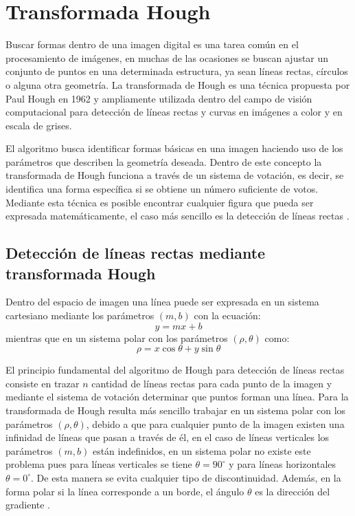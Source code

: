 \section{Transformada Hough} \label{sec:transformada_Hough}

Buscar formas dentro de una imagen digital es una tarea común en el procesamiento de imágenes, en muchas de las ocasiones se buscan ajustar un conjunto de puntos en una determinada estructura, ya sean líneas rectas, círculos o alguna otra geometría. La transformada de Hough es una técnica propuesta por Paul Hough en 1962 y ampliamente utilizada dentro del campo de visión computacional para detección de líneas rectas y curvas en imágenes a color y en escala de grises.

El algoritmo busca identificar formas básicas en una imagen haciendo uso de los parámetros que describen la geometría deseada. Dentro de este concepto la transformada de Hough funciona a través de un sistema de votación, es decir, se identifica una forma específica si se obtiene un número suficiente de votos. Mediante esta técnica es posible encontrar cualquier figura que pueda ser expresada matemáticamente, el caso más sencillo es la detección de líneas rectas \cite{forsyth2011computer}.

\subsection{Detección de líneas rectas mediante transformada Hough} \label{sub:detección_de_líneas_rectas_mediante_transformada_Hough}

Dentro del espacio de imagen una línea puede ser expresada en un sistema cartesiano mediante los parámetros $(m, b)$ con la ecuación:
\begin{equation}
    y = mx + b
\end{equation}
mientras que en un sistema polar con los parámetros $(\rho, \theta)$ como:
\begin{equation}
    \rho = x \cos{\theta} + y \sin{\theta}
    \label{eqn:polar_line} 
\end{equation}

El principio fundamental del algoritmo de Hough para detección de líneas rectas consiste en trazar $n$ cantidad de líneas rectas para cada punto de la imagen y mediante el sistema de votación determinar que puntos forman una línea. Para la transformada de Hough resulta más sencillo trabajar en un sistema polar con los parámetros $(\rho, \theta)$, debido a que para cualquier punto de la imagen existen una infinidad de líneas que pasan a través de él, en el caso de líneas verticales los parámetros $(m, b)$ están indefinidos, en un sistema polar no existe este problema pues para líneas verticales se tiene $\theta = 90^\circ$ y para líneas horizontales $\theta = 0^\circ$. De esta manera se evita cualquier tipo de discontinuidad. Además, en la forma polar si la línea corresponde a un borde, el ángulo $\theta$ es la dirección del gradiente \cite{gonzalez2009digital}.

